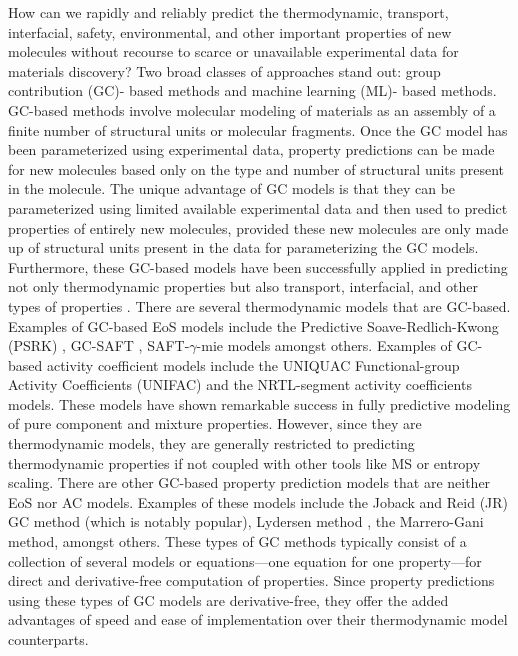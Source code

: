 \documentclass[journal=jacsat,manuscript=article]{achemso}
\begin{document}
How can we rapidly and reliably predict the thermodynamic, transport, interfacial, safety, environmental, and other important properties of new molecules without recourse to scarce or unavailable experimental data for materials discovery? Two broad classes of approaches stand out: group contribution (GC)- based methods and machine learning (ML)- based methods. 
GC-based methods involve molecular modeling of materials as an assembly of a finite number of structural units or molecular fragments. 
Once the GC model has been parameterized using experimental data, property predictions can be made for new molecules based only on the type and number of structural units present in the molecule. 
The unique advantage of GC models is that they can be parameterized using limited available experimental data and then used to predict properties of entirely new molecules, provided these new molecules are only made up of structural units present in the data for parameterizing the GC models. 
Furthermore, these GC-based models have been successfully applied in predicting not only thermodynamic properties but also transport, interfacial, and other types of properties \cite{gharagheiziGroupContributionModel2012, chagasCalculationInterfacialTension2021, ohExtensionGroupContribution2005, gardasGroupContributionMethods2009, ohGroupContributionModel1997}. 
There are several thermodynamic models that are GC-based. 
Examples of GC-based EoS models include the Predictive Soave-Redlich-Kwong (PSRK) \cite{nasrifarSaturatedLiquidDensity1998, liPredictionGasSolubilities2001},  GC-SAFT \cite{tamouzaApplicationBinaryMixtures2005, nguyenhuynhApplicationGCSAFTEOS2008, nguyenthiApplicationGroupContribution2005}, SAFT-$\gamma$-mie \cite{dufalPredictionThermodynamicProperties2014, haslamExpandingApplicationsSAFTg2020a,
fayaz-torshiziCoarseGrainedMolecularSimulation2022,
ervikBottledSAFTWeb2016} models amongst others. Examples of GC-based activity coefficient models include the UNIQUAC Functional-group Activity Coefficients (UNIFAC) \cite{fredenslundVaporLiquidEquilibriaUsing2012} and the NRTL-segment activity coefficients \cite{chenSolubilityModelingNonrandom2004} models. 
These models have shown remarkable success in fully predictive modeling of pure component and mixture properties. However, since they are thermodynamic models, they are generally restricted to predicting thermodynamic properties if not coupled with other tools like MS or entropy scaling.
There are other GC-based property prediction models that are neither EoS nor AC models. Examples of these models include the Joback and Reid \cite{jobackEstimationPureComponentProperties1987} (JR) GC method (which is notably popular), Lydersen method \cite{simonEstimationCriticalProperties1956}, the Marrero-Gani method, amongst others. These types of GC methods typically consist of a collection of several models or equations—one equation for one property—for direct and derivative-free computation of properties. Since property predictions using these types of GC models are derivative-free, they offer the added advantages of speed and ease of implementation over their thermodynamic model counterparts.
\end{document}
